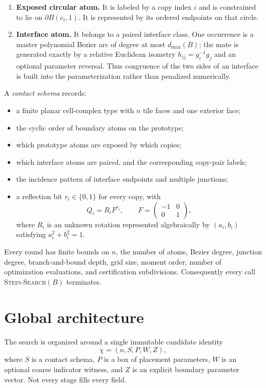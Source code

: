 \documentclass[11pt]{article}
\begin{document}
\begin{enumerate}[label=\textbf{A\arabic*.},leftmargin=16mm]
\item \textbf{Exposed circular atom.} It is labeled by a copy index $i$ and is constrained to lie on $\partial B(c_i,1)$. It is represented by its ordered endpoints on that circle.
\item \textbf{Interface atom.} It belongs to a paired interface class. One occurrence is a master polynomial Bezier arc of degree at most $d_{\max}(B)$; the mate is generated exactly by a relative Euclidean isometry $h_{ij}=g_i^{-1}g_j$ and an optional parameter reversal. Thus congruence of the two sides of an interface is built into the parameterization rather than penalized numerically.
\end{enumerate}

A \emph{contact schema} records:
\begin{itemize}[leftmargin=7mm]
\item a finite planar cell-complex type with $n$ tile faces and one exterior face;
\item the cyclic order of boundary atoms on the prototype;
\item which prototype atoms are exposed by which copies;
\item which interface atoms are paired, and the corresponding copy-pair labels;
\item the incidence pattern of interface endpoints and multiple junctions;
\item a reflection bit $r_i\in\{0,1\}$ for every copy, with
\[
Q_i=R_i F^{r_i},\qquad F=\begin{pmatrix}-1&0\\0&1\end{pmatrix},
\]
where $R_i$ is an unknown rotation represented algebraically by $(a_i,b_i)$ satisfying $a_i^2+b_i^2=1$.
\end{itemize}

Every round has finite bounds on $n$, the number of atoms, Bezier degree, junction degree, branch-and-bound depth, grid size, moment order, number of optimization evaluations, and certification subdivisions. Consequently every call \textsc{Stein-Search}$(B)$ terminates.

\section{Global architecture}

The search is organized around a single immutable candidate identity
\[
\chi=(n,S,P,W,Z),
\]
where $S$ is a contact schema, $P$ is a box of placement parameters, $W$ is an optional coarse indicator witness, and $Z$ is an explicit boundary parameter vector. Not every stage fills every field.
\end{document}
